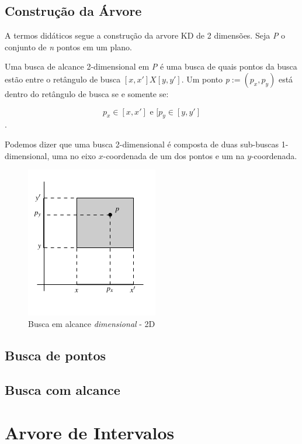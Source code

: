 \subsection{Construção da Árvore}
A termos didáticos segue a construção da arvore KD de 2 dimensões.
Seja \textit{P} o conjunto de \textit{n} pontos em um plano.

Uma busca de alcance 2-dimensional em \textit{P} é uma busca de quais pontos da busca estão
entre o retângulo de busca \([x,x'] X [y,y']\). Um ponto \textit{p}\(:= (p_x, p_y)\) está dentro do retângulo
de busca se e somente se:

\[
    p_x \in [x, x']  \text{ e } [p_y \in [y,y']
\].

Podemos dizer que uma busca 2-dimensional é composta de duas sub-buscas 1-dimensional, uma no
eixo \(x\)-coordenada de um dos pontos e um na \(y\)-coordenada.

\begin{figure}[htb]
    \caption{\label{fig:Fig_2}Busca em alcance \textit{dimensional} - 2D}
    \begin{center}
        \includegraphics{images/search_range.png}
    \end{center}
\end{figure}



\subsection{Busca de pontos}
\subsection{Busca com alcance}

\section{Arvore de Intervalos}

